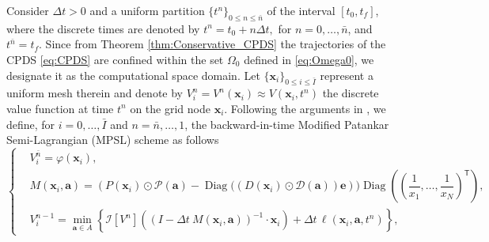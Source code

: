 \documentclass[10pt]{article}
\theoremstyle{remark}
\theoremstyle{definition}
\theoremstyle{remark}
\DeclareMathOperator{\Diag}{Diag}
\begin{document}
Consider $\Delta t > 0$ and a uniform partition $\{t^n\}_{0\leq n \leq \bar{n}}$ of the interval $[t_0,t_f]$, where the discrete times are denoted by $t^n=t_0+n \Delta t,$ for $n=0,\dots, \bar{n}$, and $t^{\bar{n}}=t_f$. Since from Theorem \ref{thm:Conservative_CPDS} the trajectories of the CPDS \eqref{eq:CPDS} are confined within the set $\Omega_0$ defined in \eqref{eq:Omega0}, we designate it as the computational space domain. Let $\{\bm{x}_i\}_{0\leq i \leq \bar{I}}$ represent a uniform mesh therein and denote by $V_i^{n}=V^n(\bm{x}_i)\approx V(\bm{x}_i,t^n)$ the discrete value function at time $t^n$ on the grid node $\bm{x}_i$. Following the arguments in \cite[Section 8.4.2]{FalconeFerretti}, we define, for $i=0,\dots, \bar{I}$ and $ n=\bar{n},\ldots,1$, the backward-in-time Modified Patankar Semi-Lagrangian (MPSL) scheme as follows 
\begin{equation}\label{eqn:MPSLscheme}
\left\{
    \begin{aligned}
        & V_i^{\bar{n}} = \varphi(\bm{x}_i),\\
        & M(\bm{x}_i,\bm{a})=\left(\!P(\bm{x}_i)\odot \mathcal{P}(\bm{a}) -\Diag\!\bigg(\!\left(D(\bm{x}_i)\odot \mathcal{D}(\bm{a})\right)\bm{e}\right)\!\bigg) \Diag\!\left(\!\left(\dfrac{1}{x_1},\dots,\dfrac{1}{x_N}\right)^{\!\mathsf{T}}\right), \\
        & V_i^{n-1} \! =  \min_{\bm{a} \in A} \left\{\mathcal{I} \left[ V^n\right]((I-\Delta t \ M(\bm{x}_i,\bm{a}))^{-1} \cdot \bm{x}_i)  + \Delta t \,\ell(\bm{x}_i,\bm{a},t^n)\right\},
    \end{aligned}
\right.
\end{equation}
\end{document}
